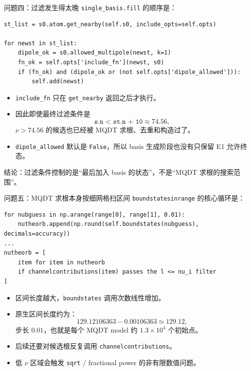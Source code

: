 \documentclass[aspectratio=169,11pt]{ctexbeamer}
\begin{document}
\begin{frame}[fragile]{问题四：过滤发生得太晚}
  \small
  \texttt{single\_basis.fill} 的顺序是：
  \begin{verbatim}
st_list = s0.atom.get_nearby(self.s0, include_opts=self.opts)

for newst in st_list:
    dipole_ok = s0.allowed_multipole(newst, k=1)
    fn_ok = self.opts['include_fn'](newst, s0)
    if (fn_ok) and (dipole_ok or (not self.opts['dipole_allowed'])):
        self.add(newst)
  \end{verbatim}

  \begin{itemize}
    \item \texttt{include\_fn} 只在 \texttt{get\_nearby} 返回之后才执行。
    \item 因此即使最终过滤条件是
      \[
        \texttt{s.n < st.n + 10}\approx 74.56,
      \]
      \(\nu>74.56\) 的候选也已经被 MQDT 求根、去重和构造过了。
    \item \texttt{dipole\_allowed} 默认是 \texttt{False}，所以 basis 生成阶段也没有只保留 E1 允许终态。
  \end{itemize}

  结论：过滤条件控制的是“最后加入 basis 的状态”，不是“MQDT 求根的搜索范围”。
\end{frame}

\begin{frame}[fragile]{问题五：MQDT 求根本身按细网格扫区间}
  \scriptsize
  \texttt{boundstatesinrange} 的核心循环是：
  \begin{verbatim}
for nubguess in np.arange(range[0], range[1], 0.01):
    nutheorb.append(np.round(self.boundstates(nubguess), decimals=accuracy))
...
nutheorb = [
    item for item in nutheorb
    if channelcontributions(item) passes the l <= nu_i filter
]
  \end{verbatim}

  \begin{itemize}
    \item 区间长度越大，\texttt{boundstates} 调用次数线性增加。
    \item 原生区间长度约为：
      \[
        129.12106363-0.00106363 \simeq 129.12,
      \]
      步长 \(0.01\)，也就是每个 MQDT model 约 \(1.3\times10^4\) 个初始点。
    \item 后续还要对候选根反复调用 \texttt{channelcontributions}。
    \item 低 \(\nu\) 区域会触发 \texttt{sqrt} / fractional power 的非有限数值问题。
  \end{itemize}
\end{frame}
\end{document}
